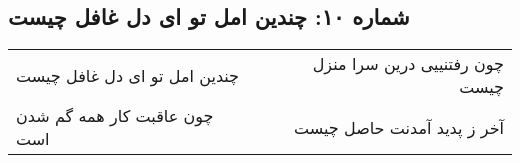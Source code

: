 \begin{center}
\section*{شماره ۱۰: چندین امل تو ای دل غافل چیست}
\label{sec:010}
\begin{longtable}{l p{0.5cm} r}
چندین امل تو ای دل غافل چیست
&&
چون رفتنییی درین سرا منزل چیست
\\
چون عاقبت کار همه گم شدن است
&&
آخر ز پدید آمدنت حاصل چیست
\\
\end{longtable}
\end{center}
